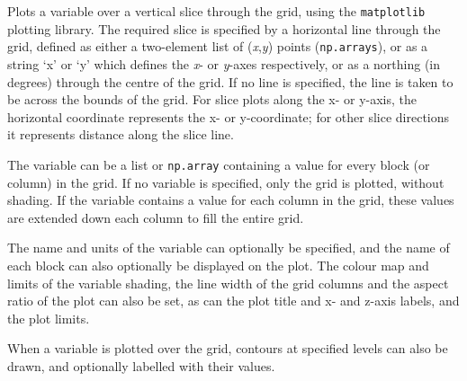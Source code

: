 Plots a variable over a vertical slice through the grid, using the \texttt{matplotlib} plotting library.  The required slice is specified by a horizontal line through the grid, defined as either a two-element list of (\emph{x},\emph{y}) points (\texttt{np.arrays}), or as a string `x' or `y' which defines the \emph{x}- or \emph{y}-axes respectively, or as a northing (in degrees) through the centre of the grid.  If no line is specified, the line is taken to be across the bounds of the grid.  For slice plots along the x- or y-axis, the horizontal coordinate represents the x- or y-coordinate; for other slice directions it represents distance along the slice line.

The variable can be a list or \texttt{np.array} containing a value for every block (or column) in the grid.  If no variable is specified, only the grid is plotted, without shading.  If the variable contains a value for each column in the grid, these values are extended down each column to fill the entire grid.

The name and units of the variable can optionally be specified, and the name of each block can also optionally be displayed on the plot.  The colour map and limits of the variable shading, the line width of the grid columns and the aspect ratio of the plot can also be set, as can the plot title and x- and z-axis labels, and the plot limits.

When a variable is plotted over the grid, contours at specified levels can also be drawn, and optionally labelled with their values.

